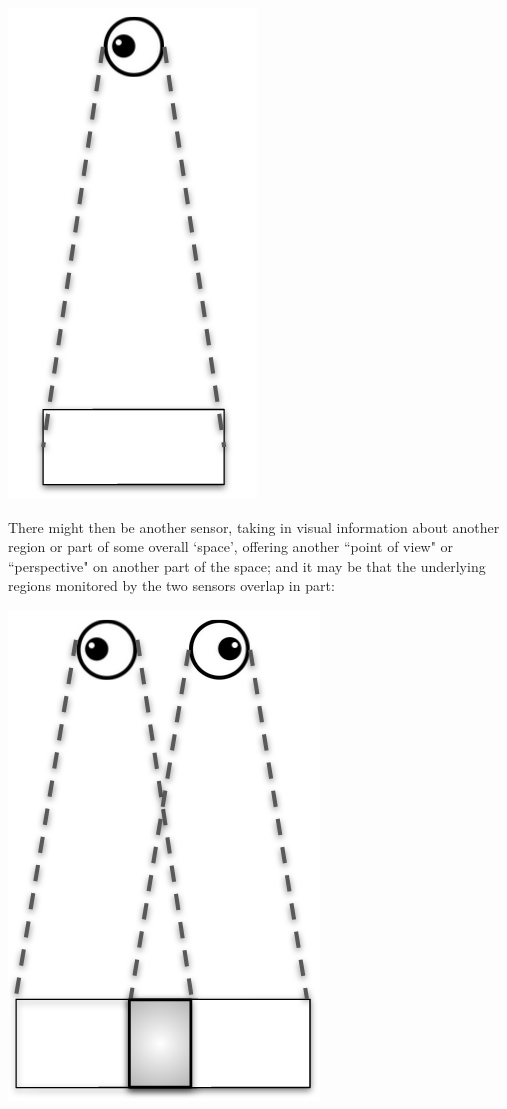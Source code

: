 \documentclass[a4paper]{book}
\theoremstyle{definition}
\theoremstyle{definition}
\theoremstyle{definition}
\theoremstyle{theorem}
\theoremstyle{definition}
\begin{document}
	\begin{center}
		\includegraphics[scale=0.25]{Eyeball1.png}
	\end{center}
	There might then be another sensor, taking in visual information about another region or part of some overall `space', offering another ``point of view" or ``perspective" on another part of the space; and it may be that the underlying regions monitored by the two sensors overlap in part:
	\begin{center}
		\includegraphics[scale=0.25]{Eyeball2.png}
	\end{center}
\end{document}
